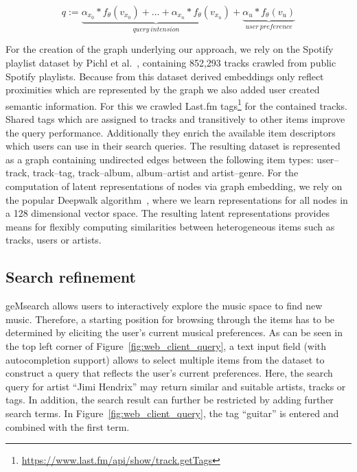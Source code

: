 \documentclass[sigconf]{acmart}
\begin{document}
\begin{equation}
\tag{1}
q := 
\underbrace{
	\alpha_{x_{0}} * f_{\theta}(v_{x_{0}}) + ... + \alpha_{x_{n}} * f_{\theta}(v_{x_{n}})
}_{query \: intension} +
\underbrace{
	\alpha_{u} * f_{\theta}(v_{u})
}_{user \: preference}
\label{eqn:query}
\end{equation}

For the creation of the graph underlying our approach, we rely on the Spotify playlist dataset by Pichl et al.~\cite{pichl2017improving}, containing 852,293 tracks crawled from public Spotify playlists. Because from this dataset derived embeddings only reflect proximities which are represented by the graph we also added user created semantic information. For this we crawled Last.fm tags\footnote{\url{https://www.last.fm/api/show/track.getTags}} for the contained tracks. Shared tags which are assigned to tracks and transitively to other items improve the query performance. Additionally they enrich the available item descriptors which users can use in their search queries. The resulting dataset is represented as a graph containing undirected edges between the following item types: user--track, track--tag, track--album, album--artist and artist--genre. For the computation of latent representations of nodes via graph embedding, we rely on the popular Deepwalk algorithm~\cite{perozzi2014deepwalk}, where we learn representations for all nodes in a 128 dimensional vector space. The resulting latent representations provides means for flexibly computing similarities between heterogeneous items such as tracks, users or artists.




\subsection{Search refinement}
\label{sec:refinement}
geMsearch allows users to interactively explore the music space to find new music. Therefore, a starting position for browsing through the items has to be determined by eliciting the user's current musical preferences. As can be seen in the top left corner of Figure~\ref{fig:web_client_query}, a text input field (with autocompletion support) allows to select multiple items from the dataset to construct a query that reflects the user's current preferences. Here, the search query for artist ``Jimi Hendrix'' may return similar and suitable artists, tracks or tags. In addition, the search result can further be restricted by adding further search terms. In Figure~\ref{fig:web_client_query}, the tag ``guitar'' is entered and combined with the first term. \\
\end{document}
